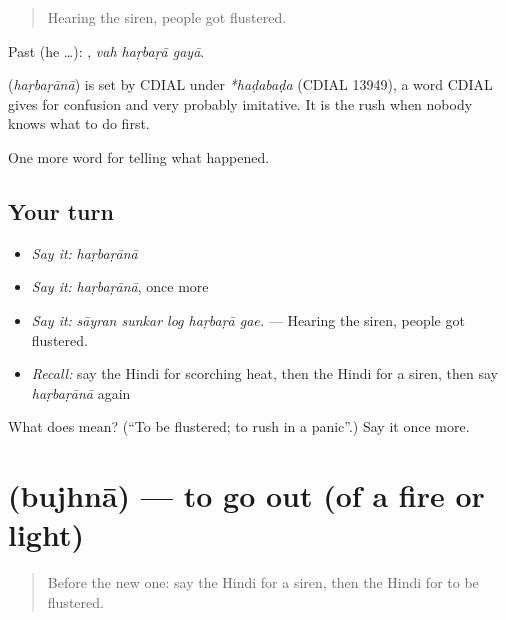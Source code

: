 \begin{quote}
Hearing the siren, people got flustered.
\end{quote}

Past (he …):   , \emph{vah haṛbaṛā gayā}.

\begin{cousinweb}
\textbf{} (\emph{haṛbaṛānā}) is set by CDIAL under \emph{*haḍabaḍa} (CDIAL 13949), a word CDIAL gives for confusion and very probably imitative. It is the rush when nobody knows what to do first.
\end{cousinweb}

\begin{grammarlens}[title={What you've built}]
One more word for telling what happened.
\end{grammarlens}

\subsection*{Your turn}
\begin{itemize}
\raggedright
  \item \emph{Say it:} \emph{haṛbaṛānā}
  \item \emph{Say it:} \emph{haṛbaṛānā}, once more
  \item \emph{Say it:} \emph{sāyran sunkar log haṛbaṛā gae.} — Hearing the siren, people got flustered.
  \item \emph{Recall:} say the Hindi for scorching heat, then the Hindi for a siren, then say \emph{haṛbaṛānā} again
\end{itemize}

\begin{tcolorbox}[breakable,colback=teal!4,colframe=teal!35!black,title={Before you move on}]
What does  mean? (\textquotedblleft{}To be flustered; to rush in a panic\textquotedblright{}.) Say it once more.
\end{tcolorbox}
\section[\texorpdfstring{\hi{बुझना} (bujhnā)}{बुझना (bujhnā)}]{ (bujhnā) — to go out (of a fire or light)}

\label{lesson:HI-C301-bujhna}



\begin{quote}
Before the new one: say the Hindi for a siren, then the Hindi for to be flustered.
\end{quote}


